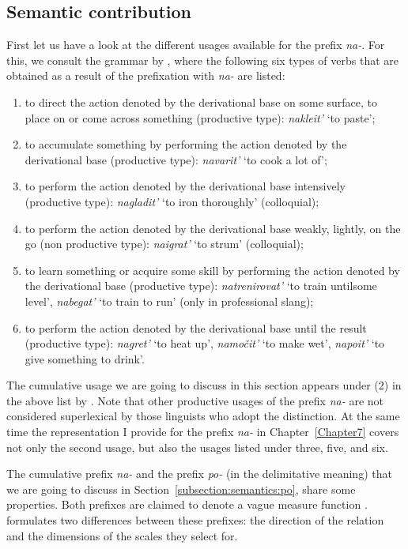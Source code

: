 \subsection{Semantic contribution}
First let us have a look at the different usages available for the prefix \textit{na-}. For this, we consult the grammar by \citet[360]{Shvedova:82}, where the following six types of verbs that are obtained as a result of the prefixation with \textit{na-} are listed:
\begin{enumerate}
\item to direct the action denoted by the derivational base on some surface, to place on or come across something (productive type): \textit{nakleit'} `to paste';
\item to accumulate something by performing the action denoted by the derivational base (productive type): \textit{navarit'} `to cook a lot of';
\item to perform the action denoted by the derivational base intensively (productive type): \textit{nagladit'} `to iron thoroughly' (colloquial);
\item to perform the action denoted by the derivational base weakly, lightly, on the go (non productive type): \textit{naigrat'} `to strum' (colloquial);
\item to learn something or acquire some skill by performing the action denoted by the derivational base (productive type): \textit{natrenirovat'} `to train until\linebreak some level', \textit{nabegat'} `to train to run' (only in professional slang);
\item to perform the action denoted by the derivational base until the result (productive type): \textit{nagret'} `to heat up', \textit{namo\v{c}it'} `to make wet', \textit{napoit'} `to give something to drink'.
\end{enumerate}

The cumulative usage we are going to discuss in this section appears under (2) in the above list by \citet{Shvedova:82}. Note that other productive usages of the prefix \textit{na-} are not considered superlexical by those linguists who adopt the distinction. At the same time the representation I provide for the prefix \textit{na-} in Chapter~\ref{Chapter7} covers not only the second usage, but also the usages listed under three, five, and six.

The cumulative prefix \textit{na-} and the prefix \textit{po-} (in the delimitative meaning) that we are going to discuss in Section~\ref{subsection:semantics:po}, share some properties. Both prefixes are claimed to denote a vague measure function \citep{Filip:00, Souchkova:04}. \citet{Souchkova:04} formulates two differences between these prefixes: the direction of the relation and the dimensions of the scales they select for.

